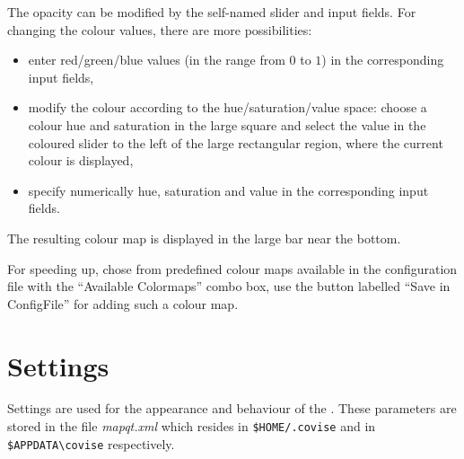          The opacity can be modified by the self-named slider and input
         fields.
         For changing the colour values, there are more possibilities:
         \begin{itemize}
         \item enter red/green/blue values (in the range from $0$ to
               $1$) in the corresponding input fields,
         \item modify the colour according to the
         hue/saturation/value space: choose a colour hue and saturation in the large square
         and select the value in the coloured slider to the left of the
         large rectangular region, where the current colour is displayed,
         \item specify numerically hue, saturation and value in the
         corresponding input fields.
         \end{itemize}
         The resulting colour map is displayed in the large bar near the
         bottom.

         For speeding up, chose from predefined
         colour maps available in the configuration file with the
         ``Available Colormaps'' combo box, use the button labelled
         ``Save in ConfigFile'' for adding such a colour map.


	
	 \section{Settings}
    \label{setting}


   Settings are used for the appearance and behaviour of the {\mapeditor}. These parameters are stored in the 
   file {\it mapqt.xml} which resides in \verb+$HOME/.covise+ and in \verb+$APPDATA\covise+ respectively.
   
